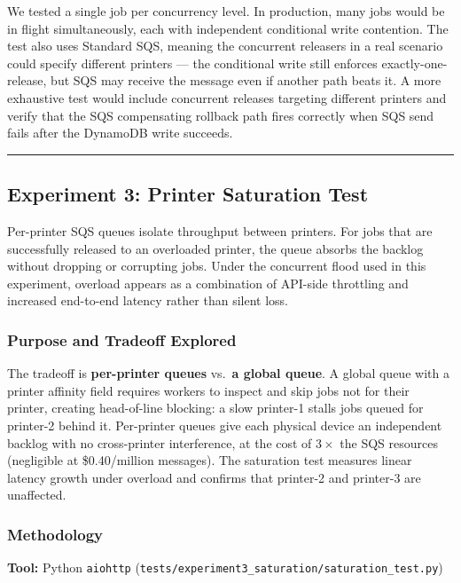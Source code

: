 \documentclass[11pt,letterpaper]{article}
\newcommand{\code}[1]{\texttt{\small #1}}
\begin{document}
\begin{limitbox}
We tested a single job per concurrency level. In production, many jobs would be in flight simultaneously, each with independent conditional write contention. The test also uses Standard SQS, meaning the concurrent releasers in a real scenario could specify different printers --- the conditional write still enforces exactly-one-release, but SQS may receive the message even if another path beats it. A more exhaustive test would include concurrent releases targeting different printers and verify that the SQS compensating rollback path fires correctly when SQS send fails after the DynamoDB write succeeds.
\end{limitbox}

\medskip\hrule\medskip

\subsection{Experiment 3: Printer Saturation Test}
\label{sec:exp3}

\begin{claimbox}
Per-printer SQS queues isolate throughput between printers. For jobs that are successfully released to an overloaded printer, the queue absorbs the backlog without dropping or corrupting jobs. Under the concurrent flood used in this experiment, overload appears as a combination of API-side throttling and increased end-to-end latency rather than silent loss.
\end{claimbox}

\subsubsection{Purpose and Tradeoff Explored}
The tradeoff is \textbf{per-printer queues} vs.\ \textbf{a global queue}. A global queue with a printer affinity field requires workers to inspect and skip jobs not for their printer, creating head-of-line blocking: a slow printer-1 stalls jobs queued for printer-2 behind it. Per-printer queues give each physical device an independent backlog with no cross-printer interference, at the cost of $3\times$ the SQS resources (negligible at \$0.40/million messages). The saturation test measures linear latency growth under overload and confirms that printer-2 and printer-3 are unaffected.

\subsubsection{Methodology}
\textbf{Tool:} Python \code{aiohttp} (\code{tests/experiment3\_saturation/saturation\_test.py})
\end{document}
